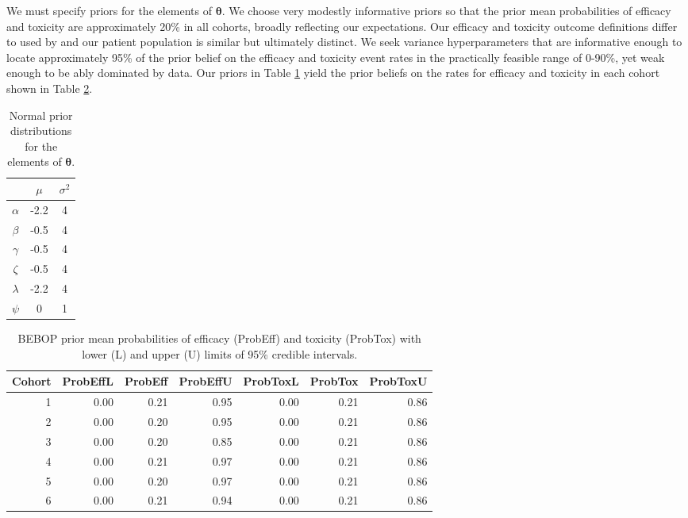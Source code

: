 \documentclass[alpha-refs]{wiley-article}
\begin{document}
We must specify priors for the elements of $\boldsymbol{\theta}$.
We choose very modestly informative priors so that the prior mean probabilities of efficacy and toxicity are approximately 20\% in all cohorts, broadly reflecting our expectations.
Our efficacy and toxicity outcome definitions differ to used by \cite{Garon2015} and our patient population is similar but ultimately distinct.
We seek variance hyperparameters that are informative enough to locate approximately 95\% of the prior belief on the efficacy and toxicity event rates in the practically feasible range of 0-90\%, yet weak enough to be ably dominated by data.
Our priors in Table \ref{tab:priors} yield the prior beliefs on the rates for efficacy and toxicity in each cohort shown in Table \ref{tab:paper_priors}.

\begin{table}[p]
	\centering
	\caption{Normal prior distributions for the elements of $\boldsymbol{\theta}$.}
	\label{tab:priors}
	\begin{tabular}{ | c | c | c | }
		\hline
		& $\mu$ & $\sigma^2$ \\
		\hline 
		$\alpha$ & -2.2 & 4 \\ 
		$\beta$ & -0.5 & 4 \\ 
		$\gamma$ & -0.5 & 4 \\ 
		$\zeta$ & -0.5 & 4 \\
		$\lambda$ & -2.2 & 4 \\ 
		$\psi$ & 0 & 1 \\ 
		\hline 
	\end{tabular} 
\end{table}

\begin{table}[ht]
\centering
\begin{tabular}{rrrrrrr}
 Cohort & ProbEffL & ProbEff & ProbEffU & ProbToxL & ProbTox & ProbToxU \\ 
 \hline
 1 & 0.00 & 0.21 & 0.95 & 0.00 & 0.21 & 0.86 \\ 
2 & 0.00 & 0.20 & 0.95 & 0.00 & 0.21 & 0.86 \\ 
  3 & 0.00 & 0.20 & 0.85 & 0.00 & 0.21 & 0.86 \\ 
  4 & 0.00 & 0.21 & 0.97 & 0.00 & 0.21 & 0.86 \\ 
  5 & 0.00 & 0.20 & 0.97 & 0.00 & 0.21 & 0.86 \\ 
  6 & 0.00 & 0.21 & 0.94 & 0.00 & 0.21 & 0.86 \\ 
  \end{tabular}
\caption{BEBOP prior mean probabilities of efficacy (ProbEff) and toxicity (ProbTox) with lower (L) and upper (U) limits of 95\% credible intervals.} 
\label{tab:paper_priors}
\end{table}
\end{document}
